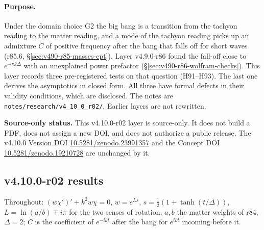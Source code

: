 \paragraph{Purpose.}
Under the domain choice G2 the big bang is a transition from the tachyon reading to the matter reading, and a mode of the tachyon
reading picks up an admixture \(C\) of positive frequency after the bang that falls off for short waves (r85.6, \S\ref{sec:v490-r85-masses-cpt}).
Layer v4.9.0-r86 found the fall-off close to \(e^{-\pi k\Delta}\) with an unexplained power prefactor (\S\ref{sec:v490-r86-wolfram-checks}).
This layer records three pre-registered tests on that question (H91--H93).  The last one derives the asymptotics in closed form.  All three have
formal defects in their validity conditions, which are disclosed.  The notes are
\texttt{notes/\allowbreak research/\allowbreak v4\_10\_0\_r02/}.  Earlier layers are not rewritten.

\noindent\textbf{Source-only status.}
This v4.10.0-r02 layer is source-only.  It does not build a PDF, does not assign a new DOI,
and does not authorize a public release.  The v4.10.0 Version DOI
\href{https://doi.org/10.5281/zenodo.23991357}{10.5281/zenodo.23991357} and the Concept DOI
\href{https://doi.org/10.5281/zenodo.19210728}{10.5281/zenodo.19210728} are unchanged by it.

\subsection*{v4.10.0-r02 results}
\label{subsec:v4100-r02-results}

Throughout: \((w\chi')'+k^2w\chi=0\), \(w=e^{Ls}\), \(s=\tfrac12(1+\tanh(t/\Delta))\), \(L=\ln(a/b)\mp i\pi\) for the two senses of rotation, \(a,b\) the
matter weights of r84, \(\Delta=2\); \(C\) is the coefficient of \(e^{-ikt}\) after the bang for \(e^{ikt}\) incoming before it.

